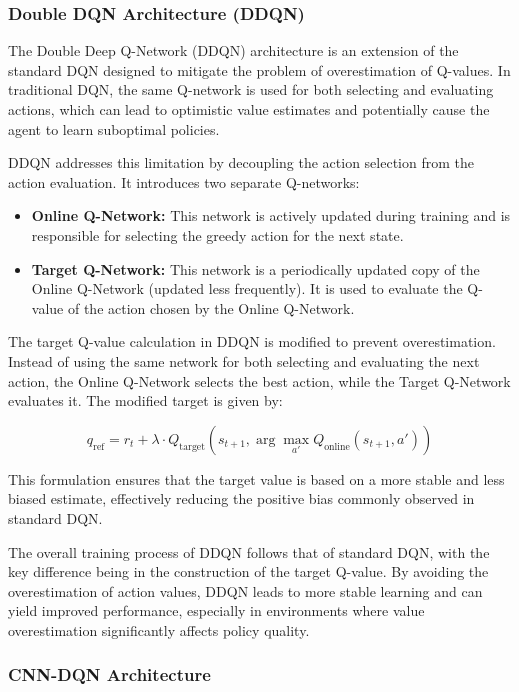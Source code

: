 \documentclass{report}
\begin{document}
\subsubsection{Double DQN Architecture (DDQN)}

The Double Deep Q-Network (DDQN) architecture is an extension of the standard DQN designed to mitigate the problem of overestimation of Q-values. In traditional DQN, the same Q-network is used for both selecting and evaluating actions, which can lead to optimistic value estimates and potentially cause the agent to learn suboptimal policies.

DDQN addresses this limitation by decoupling the action selection from the action evaluation. It introduces two separate Q-networks:

\begin{itemize}
    \item \textbf{Online Q-Network:} This network is actively updated during training and is responsible for selecting the greedy action for the next state.
    
    \item \textbf{Target Q-Network:} This network is a periodically updated copy of the Online Q-Network (updated less frequently). It is used to evaluate the Q-value of the action chosen by the Online Q-Network.
\end{itemize}

The target Q-value calculation in DDQN is modified to prevent overestimation. Instead of using the same network for both selecting and evaluating the next action, the Online Q-Network selects the best action, while the Target Q-Network evaluates it. The modified target is given by:

\[
q_{\text{ref}} = r_t + \lambda \cdot Q_{\text{target}}(s_{t+1}, \arg\max_{a'} Q_{\text{online}}(s_{t+1}, a'))
\]

This formulation ensures that the target value is based on a more stable and less biased estimate, effectively reducing the positive bias commonly observed in standard DQN.

The overall training process of DDQN follows that of standard DQN, with the key difference being in the construction of the target Q-value. By avoiding the overestimation of action values, DDQN leads to more stable learning and can yield improved performance, especially in environments where value overestimation significantly affects policy quality.

\subsubsection{CNN-DQN Architecture}
\end{document}
